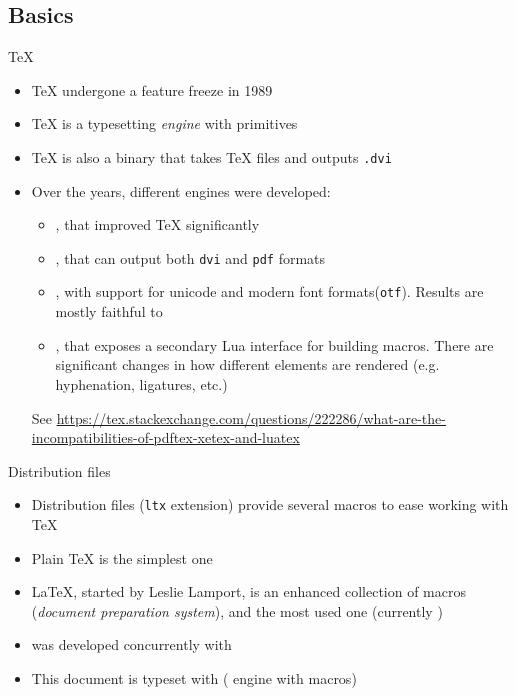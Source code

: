 \documentclass[english]{beamer}
\let\olditem\item
\renewcommand{\item}{\setlength{\itemsep}{\fill}\olditem}
\newenvironment{sitemize}{\let\item\olditem \begin{itemize}}{\vfill\end{itemize}}
\let\textttt\texttt
\renewcommand{\texttt}[1]{\colorbox{gray!10}{\textttt{#1}}}
\begin{document}
\subsection{Basics}
\label{sec:basics}

\begin{frame}[fragile]{\TeX }
\begin{itemize}
    \item \TeX{} undergone a feature freeze in 1989
    \item \TeX{} is a typesetting \textit{engine} with primitives 
    \item \TeX{} is also a binary that takes \TeX{} files and outputs \texttt{.dvi}
    \item Over the years, different engines were developed:
    \begin{sitemize}
        \item {}, that improved \TeX{} significantly
        \item {}, that can output both \texttt{dvi} and \texttt{pdf} formats
        \item {}, with support for unicode and modern font formats(\texttt{otf}). Results are mostly faithful to 
        \item {}, that exposes a secondary Lua interface for building macros. There are significant changes in how different elements are rendered (e.g. hyphenation, ligatures, etc.)
    \end{sitemize}
    {\small See \url{https://tex.stackexchange.com/questions/222286/what-are-the-incompatibilities-of-pdftex-xetex-and-luatex}}
\end{itemize}
\end{frame}

\begin{frame}{Distribution files}
\begin{itemize}
    \item Distribution files (\texttt{ltx} extension) provide several macros to ease working with \TeX{}
    \item Plain \TeX{} is the simplest one
    \item \LaTeX{}, started by Leslie Lamport, is an enhanced collection of macros (\textit{document preparation system}), and the most used one (currently )
    \item {}  was developed concurrently with 
    \item This document is typeset with  ( engine with  macros)
\end{itemize}
\end{frame}
\end{document}

